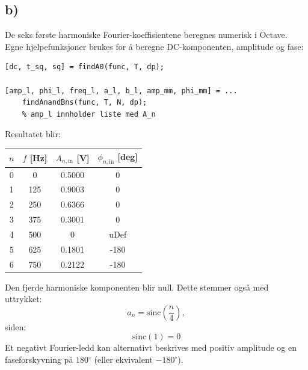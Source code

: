 \hypertarget{b}{}
\subsection*{b)}
De seks første harmoniske Fourier-koeffisientene beregnes numerisk
i Octave. Egne hjelpefunksjoner brukes for å beregne DC-komponenten,
amplitude og fase:
\begin{verbatim}
[dc, t_sq, sq] = findA0(func, T, dp);

[amp_l, phi_l, freq_l, a_l, b_l, amp_mm, phi_mm] = ...
    findAnandBns(func, T, N, dp); 
    % amp_l innholder liste med A_n
\end{verbatim}
Resultatet blir:
\begin{center}
\begin{tabular}{c|c|c|c}
$n$ & $f$ [Hz] & $A_{n,\mathrm{in}}$ [V] & $\phi_{n,\mathrm{in}}$ [deg] \\
\hline
0 & 0   & 0.5000  & 0 \\
1 & 125 & 0.9003  & 0 \\
2 & 250 & 0.6366  & 0 \\
3 & 375 & 0.3001  & 0 \\
4 & 500 & 0       & uDef \\
5 & 625 & 0.1801  & -180 \\
6 & 750 & 0.2122  & -180
\end{tabular}
\end{center}
Den fjerde harmoniske komponenten blir null. Dette stemmer også
med uttrykket:
\[
a_n=\mathrm{sinc}\left(\frac{n}{4}\right),
\]
siden:
\[
\mathrm{sinc}(1)=0
\]
Et negativt Fourier-ledd kan alternativt beskrives med positiv
amplitude og en faseforskyvning på $180^\circ$ (eller ekvivalent $-\!180^\circ$).

\hypertarget{c}{}
